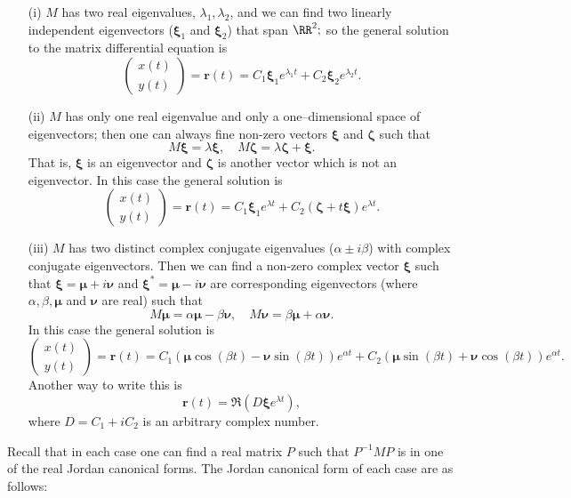 \documentclass[12pt, a4paper]{article}
\begin{document}
\begin{itemize}
	
	\item[(i)] $M$ has two real eigenvalues, $\lambda_1,\lambda_2$, and we can find two linearly independent eigenvectors ($\bm{\xi}_1$ and $\bm{\xi}_2$) that span $\RR^2;$ so the general solution to the matrix differential equation is $$\begin{pmatrix} x(t) \\ y(t) \end{pmatrix}=\bm{r}(t)=C_1\bm{\xi}_1e^{\lambda_1 t}+C_2\bm{\xi}_2e^{\lambda_2 t}.$$

	\item[(ii)] $M$ has only one real eigenvalue and only a one--dimensional space of eigenvectors; then one can always fine non-zero vectors $\bm{\xi}$ and $\bm{\zeta}$ such that $$M\bm{\xi}=\lambda \bm{\xi}, \quad M\bm{\zeta}=\lambda \bm{\zeta}+\bm{\xi}.$$ That is, $\bm{\xi}$ is an eigenvector and $\bm{\zeta}$ is another vector which is not an eigenvector. In this case the general solution is $$\begin{pmatrix} x(t) \\ y(t) \end{pmatrix}=\bm{r}(t)=C_1\bm{\xi}_1e^{\lambda t}+C_2(\bm{\zeta}+t\bm{\xi})e^{\lambda t}.$$

	\item[(iii)] $M$ has two distinct complex conjugate eigenvalues ($\alpha\pm i\beta$) with complex conjugate eigenvectors. Then we can find a non-zero complex vector $\bm{\xi}$ such that $\bm{\xi}=\bm{\mu}+i\bm{\nu}$ and $\bm{\xi}^{*}=\bm{\mu}-i\bm{\nu}$ are corresponding eigenvectors (where $\alpha, \beta, \bm{\mu}$ and $\bm{\nu}$ are real) such that $$M\bm{\mu}=\alpha\bm{\mu}-\beta\bm{\nu}, \quad M\bm{\nu}=\beta\bm{\mu}+\alpha\bm{\nu}.$$ In this case the general solution is $$\begin{pmatrix} x(t) \\ y(t) \end{pmatrix}=\bm{r}(t)=C_1\left(\bm{\mu}\cos{(\beta t)}-\bm{\nu}\sin{(\beta t)}\right)e^{\alpha t}+C_2\left(\bm{\mu}\sin{(\beta t)}+\bm{\nu}\cos{(\beta t)}\right)e^{\alpha t}.$$ Another way to write this is $$\bm{r}(t)=\Re\left(D\bm{\xi}e^{\lambda t}\right),$$ where $D = C_1+iC_2$ is an arbitrary complex number.

\end{itemize}

Recall that in each case one can find a real matrix $P$ such that $P^{-1}MP$ is in one of the real Jordan canonical forms. The Jordan canonical form of each case are as follows:
\end{document}
